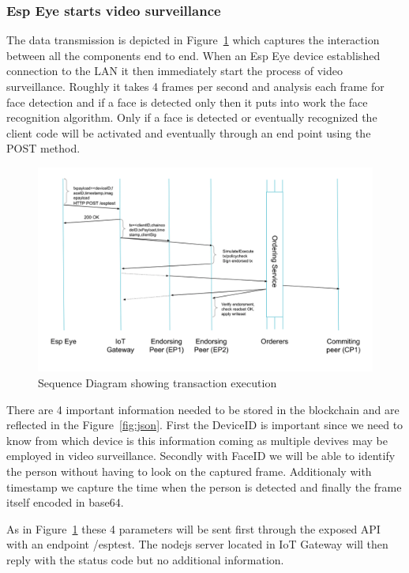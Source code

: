 \subsubsection{Esp Eye starts video surveillance}
The data transmission is depicted in Figure~\ref{fig:seqdiag} which captures the interaction between all the components end to end. When an Esp Eye device established connection to the LAN it then immediately start the process of video surveillance. Roughly it takes 4 frames per second and analysis each frame for face detection and if a face is detected only then it puts into work the face recognition algorithm. Only if a face is detected or eventually recognized the client code will be activated and eventually through an end point using the POST method. 






\begin{figure}[!htb]
    \centering
    \includegraphics[width=1\textwidth]{figures/sequencediagram1.png}
    \caption{Sequence Diagram showing transaction execution}
    \label{fig:seqdiag}
\end{figure}




There are 4 important information needed to be stored in the blockchain and are reflected in the Figure~\ref{fig:json}. First the DeviceID is important since we need to know from which device is this information coming as multiple devives may be employed in video surveillance. Secondly with FaceID we will be able to identify the person without having to look on the captured frame. Additionaly with timestamp we capture the time when the person is detected and finally the frame itself encoded in base64. 

As in Figure~\ref{fig:seqdiag} these 4 parameters will be sent first through the exposed API with an endpoint /esptest. The nodejs server located in IoT Gateway will then reply with the status code but no additional information. 

